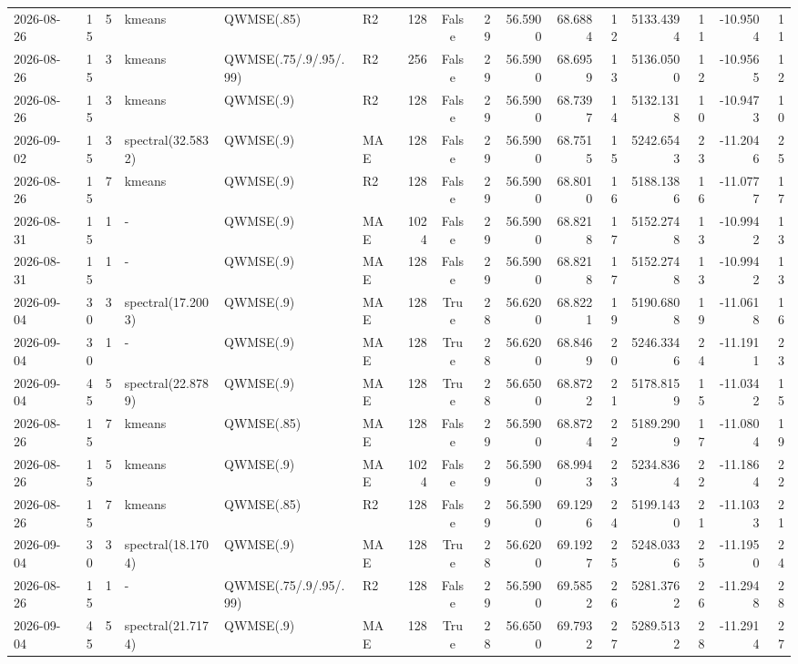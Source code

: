 \documentclass[10pt]{article}
\begin{document}
\begin{landscape}
\begin{longtable}{@{}lrrlllrcrrrrrrrr@{}}
2026-08-26 & 15 & 5 & kmeans & QWMSE(.85) & R2 & 128 & False & 29 & 56.5900 & 68.6884 & 12 & 5133.4394 & 11 & -10.9504 & 11 \\
2026-08-26 & 15 & 3 & kmeans & QWMSE(.75/.9/.95/.99) & R2 & 256 & False & 29 & 56.5900 & 68.6959 & 13 & 5136.0500 & 12 & -10.9565 & 12 \\
2026-08-26 & 15 & 3 & kmeans & QWMSE(.9) & R2 & 128 & False & 29 & 56.5900 & 68.7397 & 14 & 5132.1318 & 10 & -10.9473 & 10 \\
2026-09-02 & 15 & 3 & spectral(32.5832) & QWMSE(.9) & MAE & 128 & False & 29 & 56.5900 & 68.7515 & 15 & 5242.6543 & 23 & -11.2046 & 25 \\
2026-08-26 & 15 & 7 & kmeans & QWMSE(.9) & R2 & 128 & False & 29 & 56.5900 & 68.8010 & 16 & 5188.1386 & 16 & -11.0777 & 17 \\
2026-08-31 & 15 & 1 & - & QWMSE(.9) & MAE & 1024 & False & 29 & 56.5900 & 68.8218 & 17 & 5152.2748 & 13 & -10.9942 & 13 \\
2026-08-31 & 15 & 1 & - & QWMSE(.9) & MAE & 128 & False & 29 & 56.5900 & 68.8218 & 17 & 5152.2748 & 13 & -10.9942 & 13 \\
2026-09-04 & 30 & 3 & spectral(17.2003) & QWMSE(.9) & MAE & 128 & True & 28 & 56.6200 & 68.8221 & 19 & 5190.6808 & 19 & -11.0618 & 16 \\
2026-09-04 & 30 & 1 & - & QWMSE(.9) & MAE & 128 & True & 28 & 56.6200 & 68.8469 & 20 & 5246.3346 & 24 & -11.1911 & 23 \\
2026-09-04 & 45 & 5 & spectral(22.8789) & QWMSE(.9) & MAE & 128 & True & 28 & 56.6500 & 68.8722 & 21 & 5178.8159 & 15 & -11.0342 & 15 \\
2026-08-26 & 15 & 7 & kmeans & QWMSE(.85) & MAE & 128 & False & 29 & 56.5900 & 68.8724 & 22 & 5189.2909 & 17 & -11.0804 & 19 \\
2026-08-26 & 15 & 5 & kmeans & QWMSE(.9) & MAE & 1024 & False & 29 & 56.5900 & 68.9943 & 23 & 5234.8364 & 22 & -11.1864 & 22 \\
2026-08-26 & 15 & 7 & kmeans & QWMSE(.85) & R2 & 128 & False & 29 & 56.5900 & 69.1296 & 24 & 5199.1430 & 21 & -11.1033 & 21 \\
2026-09-04 & 30 & 3 & spectral(18.1704) & QWMSE(.9) & MAE & 128 & True & 28 & 56.6200 & 69.1927 & 25 & 5248.0336 & 25 & -11.1950 & 24 \\
2026-08-26 & 15 & 1 & - & QWMSE(.75/.9/.95/.99) & R2 & 128 & False & 29 & 56.5900 & 69.5852 & 26 & 5281.3762 & 26 & -11.2948 & 28 \\
2026-09-04 & 45 & 5 & spectral(21.7174) & QWMSE(.9) & MAE & 128 & True & 28 & 56.6500 & 69.7932 & 27 & 5289.5132 & 28 & -11.2914 & 27 \\

\end{longtable}
\end{landscape}
\end{document}

